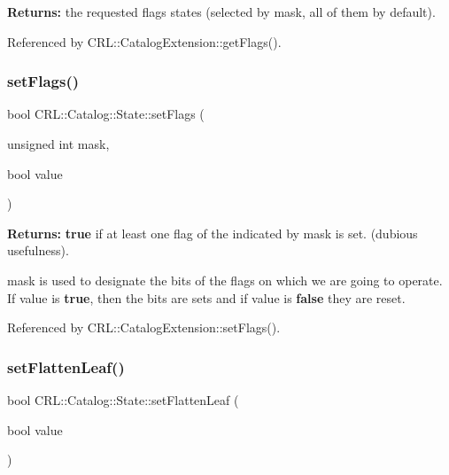 {\bfseries Returns\+:} the requested flags states (selected by {\ttfamily mask}, all of them by default). 

Referenced by C\+R\+L\+::\+Catalog\+Extension\+::get\+Flags().

\mbox{\label{classCRL_1_1Catalog_1_1State_a73a3866e9da359611638b2d725a79613}} 
\subsubsection{\texorpdfstring{set\+Flags()}{setFlags()}}
{\footnotesize\ttfamily bool C\+R\+L\+::\+Catalog\+::\+State\+::set\+Flags (\begin{DoxyParamCaption}\item[{unsigned int}]{mask,  }\item[{bool}]{value }\end{DoxyParamCaption})\hspace{0.3cm}{\ttfamily [inline]}}

{\bfseries Returns\+:} {\bfseries true} if at least one flag of the indicated by mask is set. (dubious usefulness).

{\ttfamily mask} is used to designate the bits of the flags on which we are going to operate. If {\ttfamily value} is {\bfseries true}, then the bits are sets and if {\ttfamily value} is {\bfseries false} they are reset. 

Referenced by C\+R\+L\+::\+Catalog\+Extension\+::set\+Flags().

\mbox{\label{classCRL_1_1Catalog_1_1State_a4fba9a5ea27f5a36e41f0246124a3095}} 
\subsubsection{\texorpdfstring{set\+Flatten\+Leaf()}{setFlattenLeaf()}}
{\footnotesize\ttfamily bool C\+R\+L\+::\+Catalog\+::\+State\+::set\+Flatten\+Leaf (\begin{DoxyParamCaption}\item[{bool}]{value }\end{DoxyParamCaption})\hspace{0.3cm}{\ttfamily [inline]}}

